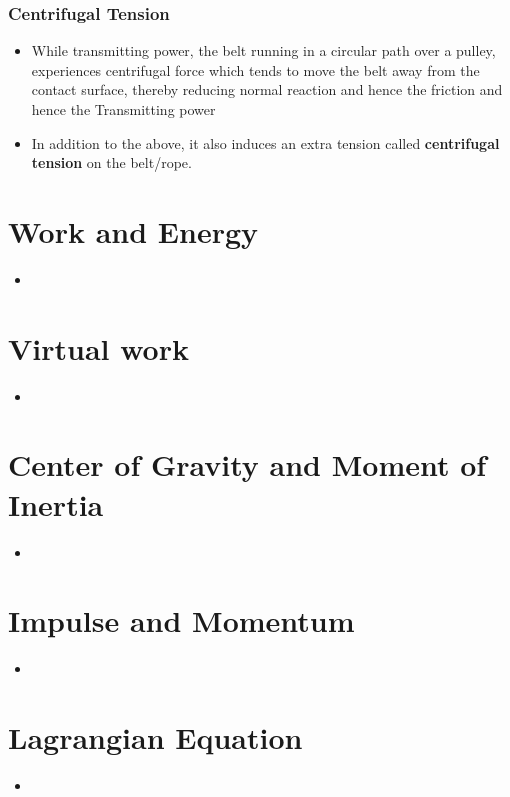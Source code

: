 \documentclass[8pt]{report}
\begin{document}
\subsection{Centrifugal Tension}
	\begin{itemize}
		\item While transmitting power, the belt running in a circular path over a pulley, experiences centrifugal force which tends to move the belt away from the contact surface, thereby reducing normal reaction and hence the friction and hence the Transmitting power
		\item In addition to the above, it also induces an extra tension called \textbf{centrifugal tension} on the belt/rope.
		
	\end{itemize}
\chapter{Work and Energy}
	\begin{itemize}
		\item
	\end{itemize}
\chapter{Virtual work}
	\begin{itemize}
		\item
	\end{itemize}
\chapter{Center of Gravity and Moment of Inertia}
	\begin{itemize}
		\item
	\end{itemize}
\chapter{Impulse and Momentum}
	\begin{itemize}
		\item
	\end{itemize}
\chapter{Lagrangian Equation}
	\begin{itemize}
		\item
	\end{itemize}
\end{document}
